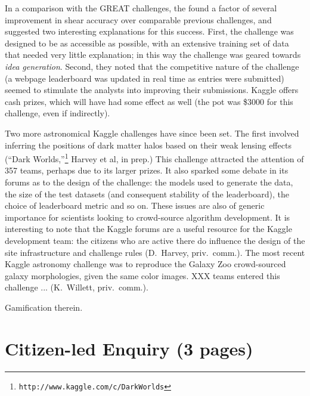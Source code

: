 \documentclass{ar2e}
\begin{document}
In a comparison with the GREAT challenges, the \citeauthor{KitchingEtal2013b}
found a factor of several improvement in shear accuracy over comparable previous
challenges, and suggested two interesting explanations for this success. First,
the challenge was designed to be as accessible as possible, with an extensive
training set of data that needed very little explanation; in this way the
challenge was geared towards {\it idea generation}. Second, they noted that the
competitive  nature of the challenge (a webpage leaderboard was updated in real
time as entries were submitted) seemed to stimulate the analysts into improving
their submissions. Kaggle offers cash prizes, which will have had some effect as
well (the pot was \$3000 for this challenge, even if indirectly).

Two more astronomical Kaggle challenges have since been set. The first involved
inferring the positions of dark matter halos based on their weak lensing effects
(``Dark Worlds,''\footnote{\texttt{http://www.kaggle.com/c/DarkWorlds}} Harvey
et al, in prep.) This challenge attracted the attention of 357 teams, perhaps
due to its larger prizes. It also sparked some debate in its forums as to the
design of the challenge: the models used to generate the data, the size of the
test datasets (and consequent stability of the leaderboard),  the choice of
leaderboard metric and so on. These issues are also of generic importance for
scientists looking to crowd-source algorithm development. It is interesting to
note that the Kaggle forums are a useful resource for the Kaggle development
team: the citizens who are active there do influence the design of the site
infrastructure and challenge rules (D.~Harvey, priv.~comm.). The most recent
Kaggle astronomy challenge was to reproduce the Galaxy Zoo crowd-sourced galaxy
morphologies, given the same color images. XXX teams entered this challenge ...
(K.\ Willett, priv.\ comm.).



Gamification therein.




\section{Citizen-led Enquiry (3 pages)}
\label{sec:explore}
\end{document}
